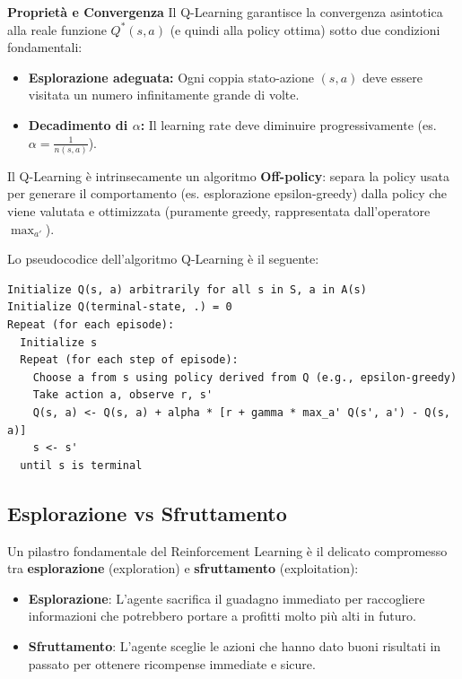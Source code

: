 \documentclass[12pt,a4paper]{article}
\begin{document}
\vspace{1em}
\noindent
\textbf{Proprietà e Convergenza}
Il Q-Learning garantisce la convergenza asintotica alla reale funzione \(Q^*(s,a)\) (e quindi alla policy ottima) sotto due condizioni fondamentali:

\begin{itemize}
    \item \textbf{Esplorazione adeguata:} Ogni coppia stato-azione \((s,a)\) deve essere visitata un numero infinitamente grande di volte.
    \item \textbf{Decadimento di \(\alpha\):} Il learning rate deve diminuire progressivamente (es. \(\alpha = \frac{1}{n(s,a)}\)).
\end{itemize}

Il Q-Learning è intrinsecamente un algoritmo \textbf{Off-policy}: separa la policy usata per generare il comportamento (es. esplorazione epsilon-greedy) dalla policy che viene valutata e ottimizzata (puramente greedy, rappresentata dall'operatore \(\max_{a'}\)).

\pagebreak

\vspace{1em}
\noindent
Lo pseudocodice dell'algoritmo Q-Learning è il seguente:

\begin{lstlisting}
Initialize Q(s, a) arbitrarily for all s in S, a in A(s)
Initialize Q(terminal-state, .) = 0
Repeat (for each episode):
  Initialize s
  Repeat (for each step of episode):
    Choose a from s using policy derived from Q (e.g., epsilon-greedy)
    Take action a, observe r, s'
    Q(s, a) <- Q(s, a) + alpha * [r + gamma * max_a' Q(s', a') - Q(s, a)]
    s <- s'
  until s is terminal
\end{lstlisting}

\subsection{Esplorazione vs Sfruttamento}

Un pilastro fondamentale del Reinforcement Learning è il delicato compromesso tra \textbf{esplorazione} (exploration) e \textbf{sfruttamento} (exploitation):

\begin{itemize}
  \item \textbf{Esplorazione}: L'agente sacrifica il guadagno immediato per raccogliere informazioni che potrebbero portare a profitti molto più alti in futuro.
  \item \textbf{Sfruttamento}: L'agente sceglie le azioni che hanno dato buoni risultati in passato per ottenere ricompense immediate e sicure.
\end{itemize}
\end{document}
